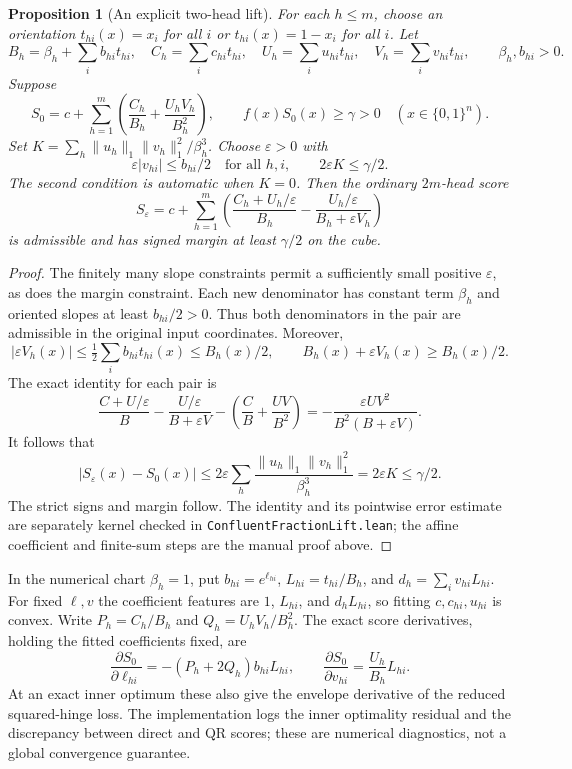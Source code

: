 \documentclass[11pt]{article}
\newtheorem{proposition}{Proposition}
\newcommand{\Qn}{\{0,1\}^n}
\begin{document}
\begin{proposition}[An explicit two-head lift]
For each $h\le m$, choose an orientation $t_{hi}(x)=x_i$ for all $i$
or $t_{hi}(x)=1-x_i$ for all $i$. Let
\[
 B_h=\beta_h+\sum_i b_{hi}t_{hi},\quad
 C_h=\sum_i c_{hi}t_{hi},\quad U_h=\sum_i u_{hi}t_{hi},\quad
 V_h=\sum_i v_{hi}t_{hi},\qquad \beta_h,b_{hi}>0.
\]
Suppose
\[
 S_0=c+\sum_{h=1}^m\left(\frac{C_h}{B_h}
                         +\frac{U_hV_h}{B_h^2}\right),\qquad
 f(x)S_0(x)\ge\gamma>0\quad(x\in\Qn).
\]
Set $K=\sum_h\|u_h\|_1\|v_h\|_1^2/\beta_h^3$.
Choose $\varepsilon>0$ with
\[
 \varepsilon|v_{hi}|\le b_{hi}/2\quad\text{for all }h,i,
 \qquad 2\varepsilon K\le\gamma/2.
\]
The second condition is automatic when $K=0$.
Then the ordinary $2m$-head score
\[
 S_\varepsilon=c+\sum_{h=1}^m
 \left(\frac{C_h+U_h/\varepsilon}{B_h}
             -\frac{U_h/\varepsilon}{B_h+\varepsilon V_h}\right)
\]
is admissible and has signed margin at least $\gamma/2$ on the cube.
\end{proposition}
\begin{proof}
The finitely many slope constraints permit a sufficiently small positive
$\varepsilon$, as does the margin constraint. Each new denominator
has constant term $\beta_h$ and oriented slopes at least $b_{hi}/2>0$.
Thus both denominators in the pair are admissible in the original
input coordinates. Moreover,
\[
 |\varepsilon V_h(x)|\le\tfrac12\sum_i b_{hi}t_{hi}(x)
 \le B_h(x)/2,
 \qquad B_h(x)+\varepsilon V_h(x)\ge B_h(x)/2.
\]
The exact identity for each pair is
\[
 \frac{C+U/\varepsilon}{B}-\frac{U/\varepsilon}{B+\varepsilon V}
       -\left(\frac CB+\frac{UV}{B^2}\right)
 =-\frac{\varepsilon UV^2}{B^2(B+\varepsilon V)}.
\]
It follows that
\[
 |S_\varepsilon(x)-S_0(x)|
 \le2\varepsilon\sum_h
       \frac{\|u_h\|_1\|v_h\|_1^2}{\beta_h^3}
 =2\varepsilon K\le\gamma/2.
\]
The strict signs and margin follow. The identity and its pointwise
error estimate are separately kernel checked in
\texttt{ConfluentFractionLift.lean}; the affine coefficient and finite-sum
steps are the manual proof above.
\end{proof}

In the numerical chart $\beta_h=1$, put $b_{hi}=e^{\ell_{hi}}$,
$L_{hi}=t_{hi}/B_h$, and $d_h=\sum_i v_{hi}L_{hi}$. For fixed
$\ell,v$ the coefficient features are $1$, $L_{hi}$, and
$d_hL_{hi}$, so fitting $c,c_{hi},u_{hi}$ is convex. Write
$P_h=C_h/B_h$ and $Q_h=U_hV_h/B_h^2$. The exact score derivatives,
holding the fitted coefficients fixed, are
\[
 \frac{\partial S_0}{\partial\ell_{hi}}
   =-(P_h+2Q_h)b_{hi}L_{hi},\qquad
 \frac{\partial S_0}{\partial v_{hi}}
   =\frac{U_h}{B_h}L_{hi}.
\]
At an exact inner optimum these also give the envelope derivative of
the reduced squared-hinge loss. The implementation logs the inner
optimality residual and the discrepancy between direct and QR scores;
these are numerical diagnostics, not a global convergence guarantee.
\end{document}

